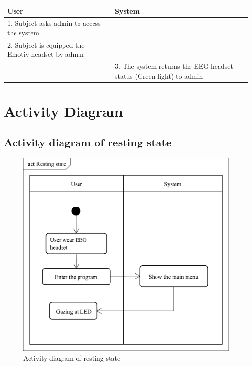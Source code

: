 \begin{itemize}
\begin{description}
	{
		\centering
		
		\begin{tabular}{| m{.47\linewidth} | m{.47\linewidth} |}
			
			\hline 
			\textbf{User} & \textbf{System}  \tabularnewline
			\hline 
			1. Subject asks admin to access the system &   \tabularnewline
			\hline 
			2. Subject is equipped the Emotiv headset by admin  &   \tabularnewline
			\hline 
			& 3. The system returns the EEG-headset status (Green light) to admin \tabularnewline
			\hline 
			
		\end{tabular}
	}
	
\end{description}
\end{itemize}

\section{Activity Diagram}


\subsection{Activity diagram of resting state}

\begin{figure}[ht]
\centering \includegraphics[scale=0.295]{chapter4/Rest.pdf}
\caption{Activity diagram of resting state}
\end{figure}



